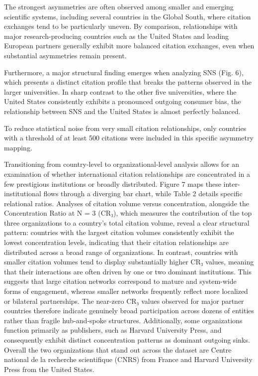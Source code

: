 \documentclass[year=2026]{cup-journal}
\begin{document}
The strongest asymmetries are often observed among smaller and emerging scientific systems, including several countries in the Global South, where citation exchanges tend to be particularly uneven. By comparison, relationships with major research-producing countries such as the United States and leading European partners generally exhibit more balanced citation exchanges, even when substantial asymmetries remain present.

Furthermore, a major structural finding emerges when analyzing SNS (Fig. 6), which presents a distinct citation profile that breaks the patterns observed in the larger universities. In sharp contrast to the other five universities, where the United States consistently exhibits a pronounced outgoing consumer bias, the relationship between SNS and the United States is almost perfectly balanced.

To reduce statistical noise from very small citation relationships, only countries with a threshold of at least 500 citations were included in this specific asymmetry mapping.

Transitioning from country-level to organizational-level analysis allows for an examination of whether international citation relationships are concentrated in a few prestigious institutions or broadly distributed. Figure 7 maps these inter-institutional flows through a diverging bar chart, while Table 2 details specific relational ratios. Analyses of citation volume versus concentration, alongside the Concentration Ratio at N = 3 (CR₃), which measures the contribution of the top three organizations to a country’s total citation volume, reveal a clear structural pattern: countries with the largest citation volumes consistently exhibit the lowest concentration levels, indicating that their citation relationships are distributed across a broad range of organizations. In contrast, countries with smaller citation volumes tend to display substantially higher CR₃ values, meaning that their interactions are often driven by one or two dominant institutions. This suggests that large citation networks correspond to mature and system-wide forms of engagement, whereas smaller networks frequently reflect more localized or bilateral partnerships. The near-zero CR₃ values observed for major partner countries therefore indicate genuinely broad participation across dozens of entities rather than fragile hub-and-spoke structures. Additionally, some organizations function primarily as publishers, such as Harvard University Press, and consequently exhibit distinct concentration patterns as dominant outgoing sinks. Overall the two organizations that stand out across the dataset are Centre national de la recherche scientifique (CNRS) from France and Harvard University Press from the United States.
\end{document}
